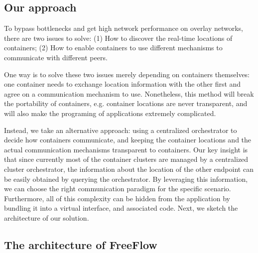 \subsection{Our approach}

To bypass bottlenecks and get high network performance on overlay
networks, there are two issues to solve: (1) How to discover the real-time locations of containers; (2) How to enable containers
to use different mechanisms to communicate with different peers.

One way is to solve these two issues merely depending on containers themselves:
one container needs to exchange location information with the other first and
agree on a communication mechanism to use. Nonetheless, this method will 
break the portability of containers, e.g. container locations are never transparent, and will also make the programing of applications extremely 
complicated. 

Instead, we take an alternative approach: using a centralized orchestrator to decide how containers communicate, and keeping the container locations and the actual
communication mechanisms transparent to containers.
Our key insight is that since currently most of the container clusters are managed by a centralized cluster orchestrator, the information about the location of the other endpoint
can be easily obtained by querying the orchestrator. By leveraging this
information, we can choose the right communication paradigm for the specific
scenario. Furthermore, all of this complexity can be hidden from the application
by bundling it into a virtual interface, and associated code. Next, we sketch the architecture of our solution.

\subsection{The architecture of FreeFlow}

